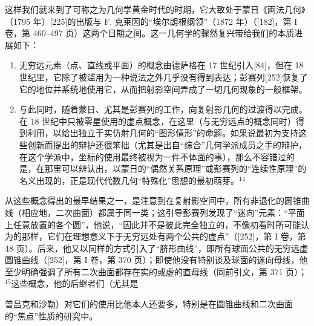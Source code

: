 这样我们就来到了可称之为几何学黄金时代的时期，它大致处于蒙日《画法几何》（1795 年）{[}225{]}的出版与 F. 克莱因的“埃尔朗根纲领”（1872 年）（{[}182{]}，第 I 卷，第 460–497 页）这两个日期之间。这一几何学的骤然复兴带给我们的本质进展如下：

\begin{enumerate}
\def\labelenumi{\Alph{enumi})}
\item
  无穷远元素（点、直线或平面）的概念由德萨格在 17 世纪引入{[}84{]}，但在 18 世纪里，它除了被滥用为一种说法之外几乎没有得到表达；彭赛列{[}252{]}恢复了它的地位并系统地使用它，从而把射影空间弄成了一切几何现象的一般框架。
\item
  与此同时，随着蒙日、尤其是彭赛列的工作，向复射影几何的过渡得以完成。在 18 世纪中只被零星使用的虚点概念，在这里（与无穷远点的概念同时）得到利用，以给出独立于实仿射几何的“图形情形”的命题。如果说最初为支持这些创新而提出的辩护还很笨拙（尤其是出自“综合”几何学派成员之手的辩护，在这个学派中，坐标的使用最终被视为一件不体面的事），那么不容错过的是，在那里可以辨认出，以蒙日的“偶然关系原理”或彭赛列的“连续性原理”的名义出现的，正是现代代数几何“特殊化”思想的最初萌芽。\(^{14}\)
\end{enumerate}

从这些概念得出的最早结果之一，是注意到在复射影空间中，所有非退化的圆锥曲线（相应地，二次曲面）都属于同一类；这引导彭赛列发现了“迷向”元素：“平面上任意放置的各个圆”，他说，“因此并不是彼此完全独立的，不像初看时所可能认为的那样，它们在理想意义下于无穷远处有两个公共的虚点”（{[}252{]}，第 I 卷，第 48 页）。后来，他又以同样的方式引入了“脐形曲线”，即所有球面公共的无穷远虚圆锥曲线（{[}252{]}，第 I 卷，第 370 页）；即使他没有特别谈及球面的迷向母线，他至少明确强调了所有二次曲面都存在实的或虚的直母线（同前引文，第 371 页）；\(^{15}\)这些概念，他的后继者们（尤其是

普吕克和沙勒）对它们的使用比他本人还要多，特别是在圆锥曲线和二次曲面的“焦点”性质的研究中。

